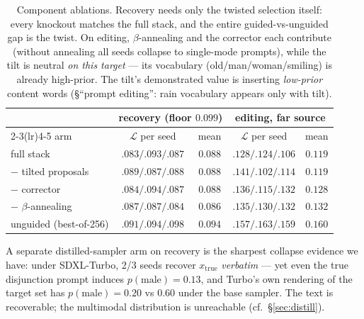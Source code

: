 \documentclass[11pt]{article}
\newcommand{\Ploss}{\mathcal{L}}
\begin{document}
\begin{table}[h]
\centering\small
\begin{tabular}{lcccc}
\toprule
& \multicolumn{2}{c}{recovery (floor $0.099$)} &
\multicolumn{2}{c}{editing, far source} \\
\cmidrule(lr){2-3}\cmidrule(lr){4-5}
arm & $\Ploss$ per seed & mean & $\Ploss$ per seed & mean \\
\midrule
full stack        & $.083/.093/.087$ & $0.088$ & $.128/.124/.106$ & $0.119$ \\
$-$ tilted proposals & $.089/.087/.088$ & $0.088$ & $.141/.102/.114$ & $0.119$ \\
$-$ corrector     & $.084/.094/.087$ & $0.088$ & $.136/.115/.132$ & $0.128$ \\
$-$ $\beta$-annealing & $.087/.087/.084$ & $0.086$ & $.135/.130/.132$ & $0.132$ \\
unguided (best-of-256) & $.091/.094/.098$ & $0.094$ & $.157/.163/.159$ & $0.160$ \\
\bottomrule
\end{tabular}
\caption{Component ablations. Recovery needs only the twisted selection
itself: every knockout matches the full stack, and the entire
guided-vs-unguided gap is the twist. On editing, $\beta$-annealing and the
corrector each contribute (without annealing all seeds collapse to
single-mode prompts), while the tilt is neutral \emph{on this target} ---
its vocabulary (old/man/woman/smiling) is already high-prior. The tilt's
demonstrated value is inserting \emph{low-prior} content words
(\S ``prompt editing'': rain vocabulary appears only with tilt).}
\end{table}

A separate distilled-sampler arm on recovery is the sharpest collapse
evidence we have: under SDXL-Turbo, 2/3 seeds recover $x_{\mathrm{true}}$
\emph{verbatim} --- yet even the true disjunction prompt induces
$p(\mathrm{male}) = 0.13$, and Turbo's own rendering of the target set has
$p(\mathrm{male}) = 0.20$ vs $0.60$ under the base sampler. The text is
recoverable; the multimodal distribution is unreachable
(cf.\ \S\ref{sec:distill}).
\end{document}
